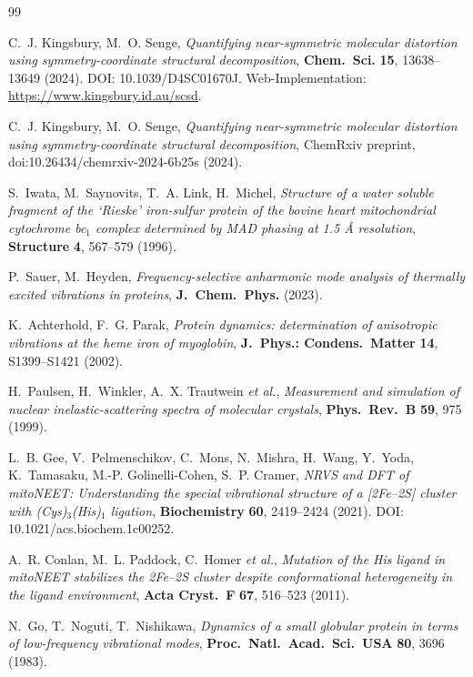 \documentclass[11pt,a4paper,twoside]{article}
\theoremstyle{remark}
\begin{document}
\begin{thebibliography}{99}

C.~J. Kingsbury, M.~O. Senge,
\emph{Quantifying near-symmetric molecular distortion using
symmetry-coordinate structural decomposition},
\textbf{Chem.\ Sci.} \textbf{15}, 13638--13649 (2024).
DOI: 10.1039/D4SC01670J. Web-Implementation:
\url{https://www.kingsbury.id.au/scsd}.

C.~J. Kingsbury, M.~O. Senge,
\emph{Quantifying near-symmetric molecular distortion using
symmetry-coordinate structural decomposition},
ChemRxiv preprint, doi:10.26434/chemrxiv-2024-6b25s (2024).

S.~Iwata, M.~Saynovits, T.~A. Link, H.~Michel,
\emph{Structure of a water soluble fragment of the {`Rieske'} iron-sulfur
protein of the bovine heart mitochondrial cytochrome bc$_1$ complex
determined by {MAD} phasing at 1.5 \AA{} resolution},
\textbf{Structure} \textbf{4}, 567--579 (1996).

P.~Sauer, M.~Heyden,
\emph{Frequency-selective anharmonic mode analysis of thermally excited
vibrations in proteins},
\textbf{J.\ Chem.\ Phys.} (2023).

K.~Achterhold, F.~G. Parak,
\emph{Protein dynamics: determination of anisotropic vibrations at the
heme iron of myoglobin},
\textbf{J.\ Phys.: Condens.\ Matter} \textbf{14}, S1399--S1421 (2002).

H.~Paulsen, H.~Winkler, A.~X. Trautwein \emph{et al.},
\emph{Measurement and simulation of nuclear inelastic-scattering spectra
of molecular crystals},
\textbf{Phys.\ Rev.\ B} \textbf{59}, 975 (1999).

L.~B. Gee, V.~Pelmenschikov, C.~Mons, N.~Mishra, H.~Wang, Y.~Yoda,
K.~Tamasaku, M.-P. Golinelli-Cohen, S.~P. Cramer,
\emph{NRVS and DFT of mitoNEET: Understanding the special vibrational
structure of a [2Fe--2S] cluster with (Cys)$_3$(His)$_1$ ligation},
\textbf{Biochemistry} \textbf{60}, 2419--2424 (2021).
DOI: 10.1021/acs.biochem.1c00252.

A.~R. Conlan, M.~L. Paddock, C.~Homer \emph{et al.},
\emph{Mutation of the His ligand in mitoNEET stabilizes the 2Fe--2S
cluster despite conformational heterogeneity in the ligand environment},
\textbf{Acta Cryst.\ F} \textbf{67}, 516--523 (2011).

N.~Go, T.~Noguti, T.~Nishikawa,
\emph{Dynamics of a small globular protein in terms of low-frequency
vibrational modes},
\textbf{Proc.\ Natl.\ Acad.\ Sci.\ USA} \textbf{80}, 3696 (1983).


\end{thebibliography}
\end{document}
